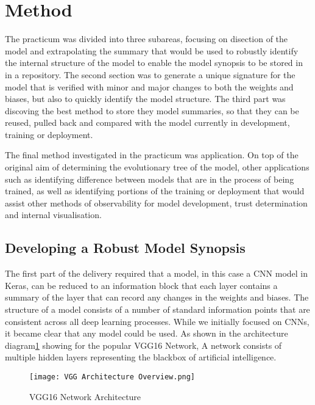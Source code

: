 \section{Method}

The practicum was divided into three subareas, focusing on disection of the model and extrapolating the summary that would be used to robustly identify the internal structure of the model to enable the model synopsis to be stored in in a repository. The second section was to generate a unique signature for the model that is verified with minor and major changes to both the weights and biases, but also to quickly identify the model structure. The third part was discoving the best method to store they model summaries, so that they can be reused, pulled back and compared with the model currently in development, training or deployment.

The final method investigated in the practicum was application. On top of the original aim of determining the evolutionary tree of the model, other applications such as identifying difference between models that are in the process of being trained, as well as identifying portions of the training or deployment that would assist other methods of observability for model development, trust determination and internal visualisation.

\subsection{Developing a Robust Model Synopsis}
The first part of the delivery required that a model, in this case a CNN model in Keras, can be reduced to an information block that each layer contains a summary of the layer that can record any changes in the weights and biases. The structure of a model consists of a number of standard information points that are consistent across all deep learning processes. While we initially focused on CNNs, it became clear that any model could be used. As shown in the architecture diagram\ref{fig:vgg16Architecture} showing for the popular VGG16 Network\cite{simonyan_deep_2014}, A network consists of multiple hidden layers representing the blackbox of artificial intelligence.

\begin{figure}[!ht]
    \centering
    \texttt{[image: VGG Architecture Overview.png]}
    \caption{VGG16 Network Architecture}
    \label{fig:vgg16Architecture}
\end{figure}

